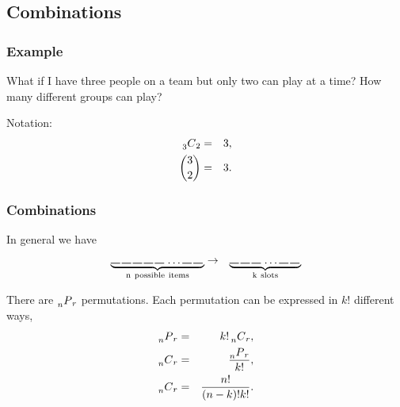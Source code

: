 \subsection{Combinations}

\begin{frame}
  \frametitle{Example}

  What if I have three people on a team but only two can play at a
  time? How many different groups can play?

  \vfill

  {

    Notation:
    \begin{eqnarray*}
      \prescript{~}{3}C_2 & = & 3, \\
      3 \choose 2  & = & 3.
    \end{eqnarray*}

  }
  
\end{frame}


\begin{frame}
  \frametitle{Combinations}

  In general we have 
  \begin{eqnarray*}
    \underbrace{
      \rule{.3cm}{.2mm} \hspace{.05cm} 
      \rule{.3cm}{.2mm} \hspace{.05cm} 
      \rule{.3cm}{.2mm} \hspace{.05cm} 
      \rule{.3cm}{.2mm} \hspace{.05cm} 
      \rule{.3cm}{.2mm} \hspace{.05cm} \ldots
      \rule{.3cm}{.2mm} \hspace{.05cm} 
      \rule{.3cm}{.2mm} \hspace{.05cm}}_{\mathrm{n~possible~items}}
    & \rightarrow & 
    \underbrace{
      \rule{.3cm}{.2mm} \hspace{.05cm} 
      \rule{.3cm}{.2mm} \hspace{.05cm} 
      \rule{.3cm}{.2mm} \hspace{.05cm} \ldots
      \rule{.3cm}{.2mm} \hspace{.05cm} 
      \rule{.3cm}{.2mm} \hspace{.05cm}}_{\mathrm{k~slots}}
  \end{eqnarray*}

  {

    There are $\prescript{~}{n}{P}_r$ permutations. Each permutation
    can be expressed in $k!$ different ways,
    \begin{eqnarray*}
      \prescript{~}{n}{P}_r & = & k! \prescript{~}{n}{C}_r, \\
      \prescript{~}{n}{C}_r & = & \frac{\prescript{~}{n}{P}_r}{k!}, \\
      \prescript{~}{n}{C}_r & = & \frac{n!}{(n-k)!k!}.
    \end{eqnarray*}
  }
  
\end{frame}

